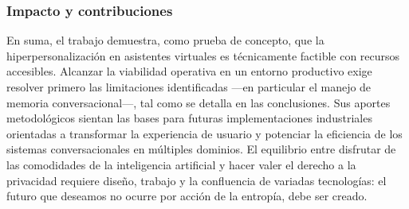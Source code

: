 \subsubsection{Impacto y contribuciones}

En suma, el trabajo demuestra, como prueba de concepto, que la hiperpersonalización en asistentes virtuales es técnicamente factible con recursos accesibles. Alcanzar la viabilidad operativa en un entorno productivo exige resolver primero las limitaciones identificadas —en particular el manejo de memoria conversacional—, tal como se detalla en las conclusiones. Sus aportes metodológicos sientan las bases para futuras implementaciones industriales orientadas a transformar la experiencia de usuario y potenciar la eficiencia de los sistemas conversacionales en múltiples dominios. El equilibrio entre disfrutar de las comodidades de la inteligencia artificial y hacer valer el derecho a la privacidad requiere diseño, trabajo y la confluencia de variadas tecnologías: el futuro que deseamos no ocurre por acción de la entropía, debe ser creado.

